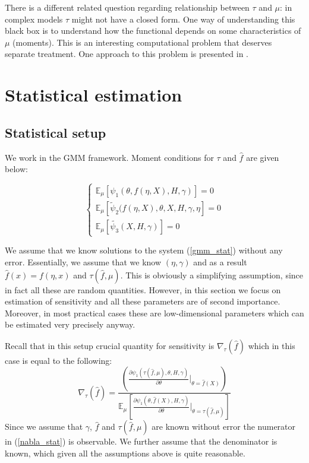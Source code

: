 \documentclass[12pt]{article}
\theoremstyle{plain}
\begin{document}
There is a different related question regarding relationship between $\tau$ and $\mu$: in complex models $\tau$ might not have a closed form. One way of understanding this black box is to understand how the functional depends on some characteristics of $\mu$ (moments). This is an interesting computational problem that deserves separate treatment. One approach to this problem is presented in \parencite{gentzkow2014measuring}.


\section{Statistical estimation}

\subsection{Statistical setup}

We work in the GMM framework. Moment conditions for $\tau$ and $\hat f$ are given below:

\begin{equation}\label{gmm_stat}
\begin{cases}
\mathbb{E}_{\mu}[\psi_1(\theta, f(\eta,X), H,\gamma)] = 0\\
\mathbb{E}_{\mu}[\tilde{\psi}_2(f(\eta,X),\theta,X,H,\gamma,\eta]=0\\
\mathbb{E}_{\mu}[\tilde{\psi_3}(X,H,\gamma)] = 0
\end{cases}
\end{equation}

We assume that we know solutions to the system (\ref{gmm_stat}) without any error. Essentially, we assume that we know $(\eta,\gamma)$ and as a result $\hat f(x) = f(\eta,x)$ and $\tau(\hat f, \mu)$. This is obviously a simplifying assumption, since in fact all these are random quantities. However, in this section we focus on estimation of sensitivity and all these parameters are of second importance. Moreover, in most practical cases these are low-dimensional parameters which can be estimated very precisely  anyway.

Recall that in this setup crucial quantity for sensitivity is $\nabla_{\tau}(\hat f)$ which in  this case is equal to the following:
\begin{equation}\label{nabla_stat}
\nabla_{\tau}(\hat f) =  \frac{\left(\frac{\partial \psi_1(\tau(\hat f,\mu),\theta, H,\gamma)}{\partial \theta}|_{\theta =\hat f(X)}\right)}{\mathbb{E}_{\mu}\left[\frac{\partial \psi_1(\theta, \hat f(X), H,\gamma)}{\partial \theta}|_{\theta = \tau(\hat f,\mu)}\right]}
\end{equation}
Since we assume that $\gamma$, $\hat f$ and $\tau(\hat f, \mu)$ are known without error the numerator in (\ref{nabla_stat}) is observable. We further assume that the denominator is known, which given all the assumptions above is quite reasonable. 
\end{document}
